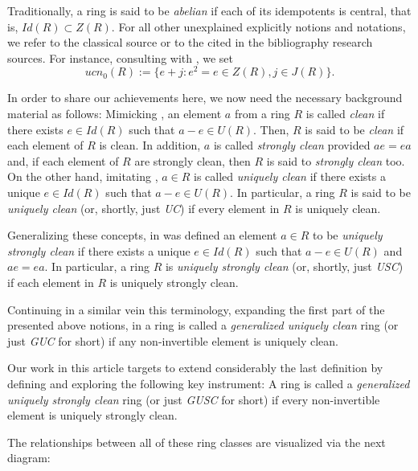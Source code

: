 \documentclass[12pt]{amsart}
\theoremstyle{definition}
\begin{document}
Traditionally, a ring is said to be {\it abelian} if each of its idempotents is central, that is, $Id(R)\subset Z(R)$. For all other unexplained explicitly notions and notations, we refer to the classical source \cite{61} or to the cited in the bibliography research sources. For instance, consulting with \cite[Definition 3.4]{5}, we set $$ucn_{0}(R):=\{ e+j:e^{2}=e\in Z(R), j\in J(R)\}.$$

In order to share our achievements here, we now need the necessary background material as follows: Mimicking \cite{8}, an element $a$ from a ring $R$ is called {\it clean} if there exists $e\in Id(R)$ such that $a-e\in U(R)$. Then, $R$ is said to be {\it clean} if each element of $R$ is clean. In addition, $a$ is called {\it strongly clean} provided $ae=ea$ and, if each element of $R$ are strongly clean, then $R$ is said to {\it strongly clean} too.
On the other hand, imitating \cite{3}, $a\in R$ is called {\it uniquely clean} if there exists a unique $e \in Id(R)$ such that $a-e \in U(R)$. In particular, a ring $R$ is said to be {\it uniquely clean} (or, shortly, just {\it UC}) if every element in $R$ is uniquely clean.

Generalizing these concepts, in \cite{2} was defined an element $a \in R$ to be {\it uniquely strongly clean} if there exists a unique $e \in Id(R)$ such that $a-e \in U(R)$ and $ae=ea$. In particular, a ring $R$ is {\it uniquely strongly clean} (or, shortly, just {\it USC}) if each element in $R$ is uniquely strongly clean.

Continuing in a similar vein this terminology, expanding the first part of the presented above notions, in \cite{1} a ring is called a {\it generalized uniquely clean} ring (or just {\it GUC} for short) if any non-invertible element is uniquely clean.

\medskip

Our work in this article targets to extend considerably the last definition by defining and exploring the following key instrument: A ring is called a {\it generalized uniquely strongly clean} ring (or just {\it GUSC} for short) if every non-invertible element is uniquely strongly clean.

The relationships between all of these ring classes are visualized via the next diagram:

\bigskip

\begin{center}
\end{center}
\end{document}
